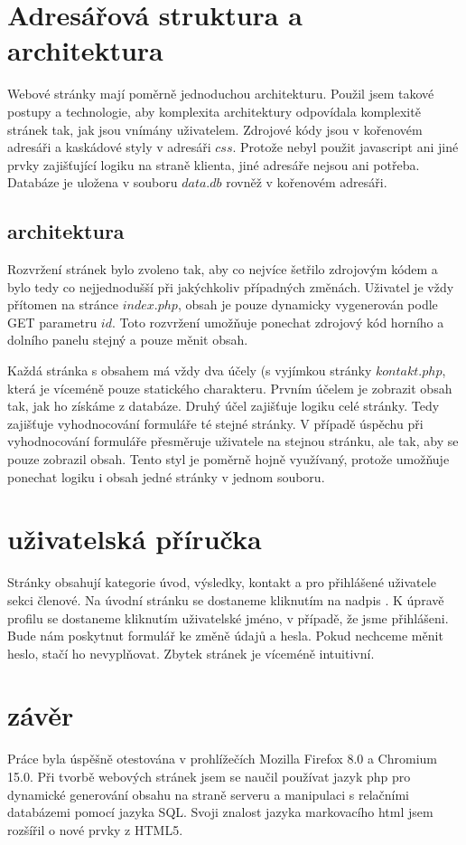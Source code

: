 \documentclass[12pt]{article}
\begin{document}
\section{Adresářová struktura a architektura}
Webové stránky mají poměrně jednoduchou architekturu. Použil jsem takové
postupy a technologie, aby komplexita architektury odpovídala komplexitě
stránek tak, jak jsou vnímány uživatelem. Zdrojové kódy jsou v kořenovém
adresáři a kaskádové styly v adresáři $css$. Protože nebyl použit javascript
ani jiné prvky zajišťující logiku na straně klienta, jiné adresáře nejsou ani
potřeba. Databáze je uložena v souboru $data.db$ rovněž v kořenovém adresáři.

\subsection{architektura}
Rozvržení stránek bylo zvoleno tak, aby co nejvíce šetřilo zdrojovým kódem
a bylo tedy co nejjednodušší při jakýchkoliv případných změnách. Uživatel je
vždy přítomen na stránce $index.php$, obsah je pouze dynamicky vygenerován
podle GET parametru $id$. Toto rozvržení umožňuje ponechat zdrojový kód horního
a dolního panelu stejný a pouze měnit obsah.

Každá stránka s obsahem má vždy dva účely (s vyjímkou stránky $kontakt.php$,
která je víceméně pouze statického charakteru. Prvním účelem je zobrazit obsah
tak, jak ho získáme z databáze. Druhý účel zajišťuje logiku celé stránky. Tedy
zajišťuje vyhodnocování formuláře té stejné stránky. V případě úspěchu při
vyhodnocování formuláře přesměruje uživatele na stejnou stránku, ale tak, aby
se pouze zobrazil obsah. Tento styl je poměrně hojně využívaný, protože
umožňuje ponechat logiku i obsah jedné stránky v jednom souboru.

\section{uživatelská příručka}
Stránky obsahují kategorie úvod, výsledky, kontakt a pro přihlášené uživatele
sekci členové. Na úvodní stránku se dostaneme kliknutím na nadpis .
K úpravě profilu se dostaneme kliknutím uživatelské jméno, v případě, že jsme
přihlášeni. Bude nám poskytnut formulář ke změně údajů a hesla. Pokud nechceme
měnit heslo, stačí ho nevyplňovat. Zbytek stránek je víceméně intuitivní.

\section{závěr}
Práce byla úspěšně otestována v prohlížečích Mozilla Firefox 8.0 a Chromium
15.0.  Při tvorbě webových stránek jsem se naučil používat jazyk php pro
dynamické generování obsahu na straně serveru a manipulaci s relačními
databázemi pomocí jazyka SQL. Svoji znalost jazyka markovacího html jsem
rozšířil o nové prvky z HTML5.
\end{document}
